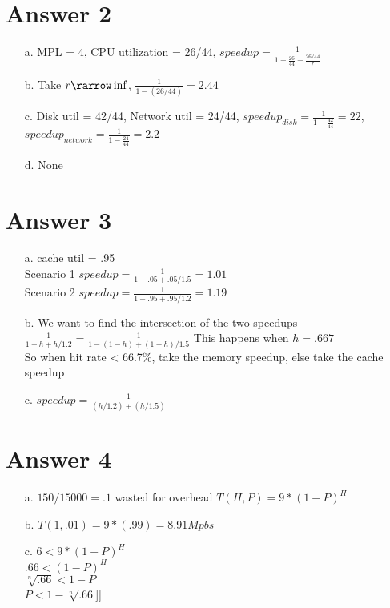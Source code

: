 \documentclass[11pt]{article}
\theoremstyle{definition}
\begin{document}
\section*{Answer 2}
\begin{enumerate}
	\item[a.] MPL = 4, CPU utilization = 26/44, $speedup = \frac{1}{1-\frac{26}{44} + \frac{26/44}{r}}$ 
	\item[b.] Take $r \rarrow \inf$, $\frac{1}{1 - (26/44)} = 2.44$
	\item[c.] Disk util = 42/44, Network util = 24/44, $speedup_{disk} = \frac{1}{1 - \frac{42}{44}} = 22$, $speedup_{network} = \frac{1}{1 - \frac{24}{44}} = 2.2$
	\item[d.] None
\end{enumerate}

\section*{Answer 3}
\begin{enumerate}
	\item[a.] cache util = .95\\
	Scenario 1 $speedup = \frac{1}{1 - .05 + .05 / 1.5} = 1.01$\\
	Scenario 2 $speedup = \frac{1}{1 - .95 + .95 / 1.2} = 1.19$\\

	\item[b.] We want to find the intersection of the two speedups\\
	$\frac{1}{1 - h + h/1.2} = \frac{1}{1 - (1-h) + (1-h)/1.5}$ This happens when $h = .667$\\
	So when hit rate < 66.7\%, take the memory speedup, else take the cache speedup

	\item[c.] $speedup = \frac{1}{(h/1.2) + (h/1.5)}$
\end{enumerate}

\section*{Answer 4}
\begin{enumerate}
	\item[a.] $150/15000 = .1$ wasted for overhead  
	$T(H,P) = 9 * (1 - P)^H$

	\item[b.] $T(1,.01) = 9 * (.99) = 8.91Mpbs$
	\item[c.] $6 < 9 * (1 - P)^H$\\
	$.66 < (1 - P)^H$\\
	$\sqrt[n]{.66} < 1 - P$\\
	$P < 1 - \sqrt[n]{.66}$]]
\end{enumerate}
\end{document}
